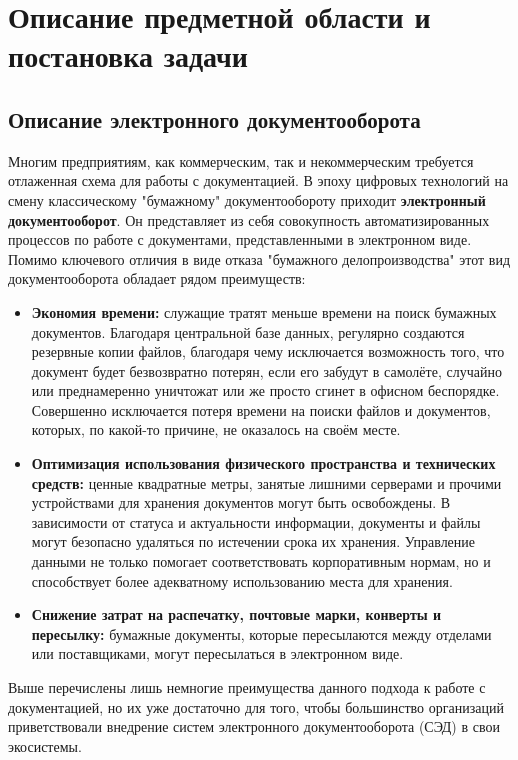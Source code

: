 \chapter{Описание предметной области и постановка задачи} \label{ch:ch1}

\section{Описание электронного документооборота} \label{sec:ch1/sec1}
Многим предприятиям, как коммерческим, так и некоммерческим требуется отлаженная схема для работы с документацией.
В эпоху цифровых технологий на смену классическому "бумажному" документообороту приходит \textbf{электронный документооборот}.
Он представляет из себя совокупность автоматизированных процессов по работе с документами, представленными в электронном виде.
 Помимо ключевого отличия в виде отказа "бумажного делопроизводства" этот вид документооборота обладает рядом преимуществ:
 \begin{itemize}
 	\item \textbf{Экономия времени:} служащие тратят меньше времени на поиск бумажных документов. Благодаря центральной базе данных, регулярно создаются резервные копии файлов, благодаря чему исключается возможность того, что документ будет безвозвратно потерян, если его забудут в самолёте, случайно или преднамеренно уничтожат или же просто сгинет в офисном беспорядке. Совершенно исключается потеря времени на поиски файлов и документов, которых, по какой-то причине, не оказалось на своём месте.
 	\item \textbf{Оптимизация использования физического пространства и технических средств:} ценные квадратные метры, занятые лишними серверами и прочими устройствами для хранения документов могут быть освобождены. В зависимости от статуса и актуальности информации, документы и файлы могут безопасно удаляться по истечении срока их хранения. Управление данными не только помогает соответствовать корпоративным нормам, но и способствует более адекватному использованию места для хранения.
 	\item \textbf{Снижение затрат на распечатку, почтовые марки, конверты и пересылку:} бумажные документы, которые пересылаются между отделами или поставщиками, могут пересылаться в электронном виде.
 \end{itemize}

Выше перечислены лишь немногие преимущества данного подхода к работе с документацией, но их уже достаточно для того, чтобы большинство организаций приветствовали внедрение 	систем электронного документооборота (СЭД) в свои экосистемы.

